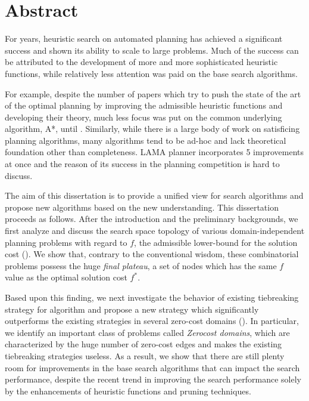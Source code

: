 \chapter{Abstract}

For years, heuristic search on automated planning has achieved a significant success and shown its
ability to scale to large problems. Much of the success can be attributed to the development of more
and more sophisticated heuristic functions, while relatively less attention was paid on the 
base search algorithms.

For example, despite the number of papers which try to push the state of the art of the
optimal planning by improving the admissible heuristic functions and developing their theory, much
less focus was put on the common underlying algorithm, A*, until \cite{Asai2016}.  Similarly, while
there is a large body of work on satisficing planning algorithms, many algorithms tend to be ad-hoc
and lack theoretical foundation other than completeness. \sota LAMA planner
\cite{richter2010lama} incorporates 5 improvements at once and the reason of its success in the
planning competition is hard to discuss.

The aim of this dissertation is to provide a unified view for search algorithms and propose new algorithms
based on the new understanding. This dissertation proceeds as follows.
% 
After the introduction and the preliminary backgrounds, we first analyze
and discuss the search space topology of various domain-independent
planning problems with regard to $f$, the admissible lower-bound for the
solution cost ().  We show that, contrary to the
conventional wisdom, these combinatorial problems possess the huge
\emph{final plateau}, a set of nodes which has the same $f$ value as the
optimal solution cost $f^*$.

Based upon this finding, we next investigate the behavior of existing
tiebreaking strategy for \astar algorithm and propose a new strategy
which significantly outperforms the existing strategies in several
zero-cost domains ().  In particular, we identify
an important class of problems called \emph{Zerocost domains}, which are
characterized by the huge number of zero-cost edges and makes the
existing tiebreaking strategies useless.
% 
As a result, we show that there are still plenty room for improvements
in the base search algorithms that can impact the search performance,
despite the recent trend in improving the search performance solely by
the enhancements of heuristic functions and pruning techniques.


